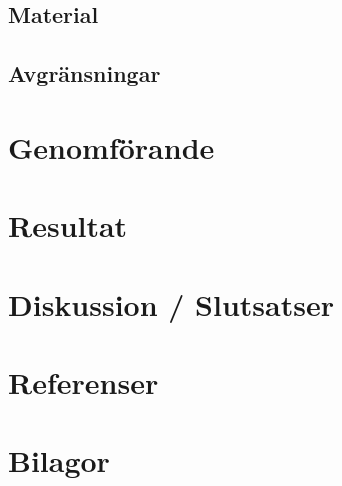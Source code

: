 \documentclass{article}
\begin{document}
\subsection{Material}

\subsection{Avgränsningar}

\section{Genomförande}

\section{Resultat}

\section{Diskussion / Slutsatser}

\section{Referenser}

\section{Bilagor}
\end{document}

